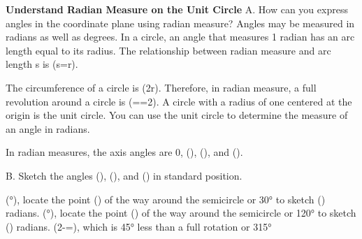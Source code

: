 \documentclass{article}
\newenvironment{example}[1]{}{}         %
\newcommand{\answer}[1]{}               %
\newcommand{\placeholder}[2]{}          %
\newcommand{\te}[1]{}                   %
\begin{document}
\begin{example}{2}
\textbf{Understand Radian Measure on the Unit Circle}
A. How can you express angles in the coordinate plane using radian measure?
Angles may be measured in radians as well as degrees. In a circle, an angle that measures 1 radian has an arc length equal to its radius.
The relationship between radian measure and arc length s is (s=\theta r).
\placeholder{graph}{Black circle centered at origin on arrowed x,y axes without ticks. Blue radius r along positive x and blue radius to first quadrant point. Red intercepted arc labeled s=r and angle callout theta=1 radian. Blue endpoints and black center.}
The circumference of a circle is (2\pi r). Therefore, in radian measure, a full revolution around a circle is (\theta==2\pi).
A circle with a radius of one centered at the origin is the unit circle. You can use the unit circle to determine the measure of an angle in radians.
\placeholder{graph}{Red unit circle on black arrowed x,y axes with black origin, red radius to first quadrant labeled1. Red cardinal points labeled0°,90°,180°,270°; corresponding blue labels pi/2,pi,3pi/2. No coordinate tick scale.}
\te{Callouts: An angle halfway around the circle is (\frac12(2\pi)=\pi) radians. An angle one-fourth around the circle is 90°, or (\frac14(2\pi)=\frac\pi2). A full rotation around the circle is 360°, or (2\pi) radians. 270° is (\frac34) around the circle, so it is equivalent to (\frac34(2\pi)=\frac{3\pi}{2}). GENERALIZE: Since the radius of a unit circle is 1, the radian measure is equal to the length of its intercepted arc.}
In radian measures, the axis angles are 0, (\frac{}), (\pi), and ().
\answer{An angle measuring 1 radian intercepts an arc equal to the radius; a full revolution measures (2\pi) radians.}
B. Sketch the angles (\frac{}), (), and () in standard position.
\placeholder{graph}{Three black unit circles on arrowed x,y axes centered at O, cardinal labels0,pi/2,pi,3pi/2 in blue. Red radii from O along positive x and respectively at theta=pi/6 in I, theta=2pi/3 in II, theta=7pi/4 in IV. Red points where radii meet circle, red counterclockwise angle arcs. No coordinate ticks.}
(°), locate the point () of the way around the semicircle or 30° to sketch (\frac{}) radians.
(°), locate the point () of the way around the semicircle or 120° to sketch () radians.
(2\pi-\frac{}=), which is 45° less than a full rotation or 315°
\answer{(\frac\pi6): 30°; (\frac{2\pi}{3}): 120°; (\frac{7\pi}{4}): 315°.}
\end{example}
\end{document}
